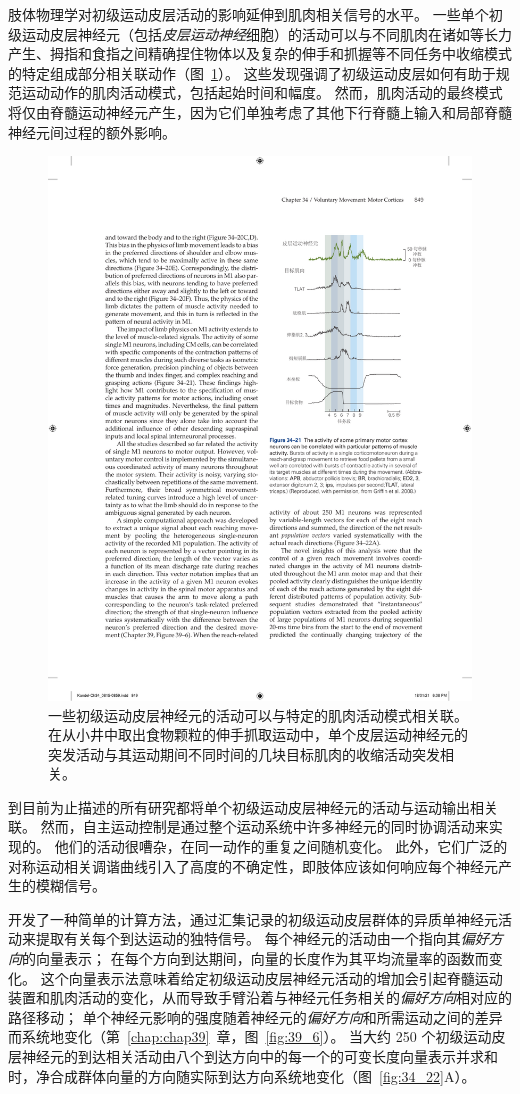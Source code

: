肢体物理学对初级运动皮层活动的影响延伸到肌肉相关信号的水平。
一些单个初级运动皮层神经元（包括\textit{皮层运动神经}细胞）的活动可以与不同肌肉在诸如等长力产生、拇指和食指之间精确捏住物体以及复杂的伸手和抓握等不同任务中收缩模式的特定组成部分相关联动作（图~\ref{fig:34_21}）。
这些发现强调了初级运动皮层如何有助于规范运动动作的肌肉活动模式，包括起始时间和幅度。
然而，肌肉活动的最终模式将仅由脊髓运动神经元产生，因为它们单独考虑了其他下行脊髓上输入和局部脊髓神经元间过程的额外影响。


\begin{figure}[htbp]
	\centering
	\includegraphics[width=0.6\linewidth]{chap34/fig_34_21}
	\caption{一些初级运动皮层神经元的活动可以与特定的肌肉活动模式相关联。
		在从小井中取出食物颗粒的伸手抓取运动中，单个皮层运动神经元的突发活动与其运动期间不同时间的几块目标肌肉的收缩活动突发相关\cite{griffin2008corticomotoneuronal}。}
	\label{fig:34_21}
\end{figure}


到目前为止描述的所有研究都将单个初级运动皮层神经元的活动与运动输出相关联。
然而，自主运动控制是通过整个运动系统中许多神经元的同时协调活动来实现的。
他们的活动很嘈杂，在同一动作的重复之间随机变化。
此外，它们广泛的对称运动相关调谐曲线引入了高度的不确定性，即肢体应该如何响应每个神经元产生的模糊信号。


开发了一种简单的计算方法，通过汇集记录的初级运动皮层群体的异质单神经元活动来提取有关每个到达运动的独特信号。
每个神经元的活动由一个指向其\textit{偏好方向}的向量表示；
在每个方向到达期间，向量的长度作为其平均流量率的函数而变化。
这个向量表示法意味着给定初级运动皮层神经元活动的增加会引起脊髓运动装置和肌肉活动的变化，从而导致手臂沿着与神经元任务相关的\textit{偏好方向}相对应的路径移动；
单个神经元影响的强度随着神经元的\textit{偏好方向}和所需运动之间的差异而系统地变化（第~\ref{chap:chap39}~章，图~\ref{fig:39_6}）。
当大约 250 个初级运动皮层神经元的到达相关活动由八个到达方向中的每一个的可变长度向量表示并求和时，净合成群体向量的方向随实际到达方向系统地变化（图~\ref{fig:34_22}A）。


